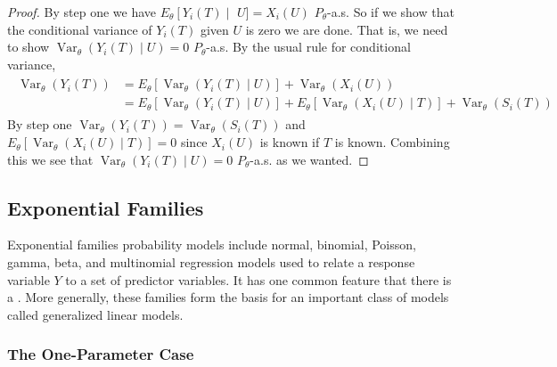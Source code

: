 \documentclass{article}
\begin{document}
\begin{proof}
By step one we have $E_{\theta}\left[Y_{i}(T) \mid\right.$ $U]=X_{i}(U)$ $P_{\theta}$-a.s. So if we show that the conditional variance of $Y_{i}(T)$ given $U$ is zero we are done. That is, we need to show $\operatorname{Var}_{\theta}\left(Y_{i}(T) \mid U\right)=0$ $P_{\theta}$-a.s. By the usual rule for conditional variance,
\begin{align*}
\begin{aligned}
\operatorname{Var}_{\theta}\left(Y_{i}(T)\right) &=E_{\theta}\left[\operatorname{Var}_{\theta}\left(Y_{i}(T) \mid U\right)\right]+\operatorname{Var}_{\theta}\left(X_{i}(U)\right) \\
&=E_{\theta}\left[\operatorname{Var}_{\theta}\left(Y_{i}(T) \mid U\right)\right]+E_{\theta}\left[\operatorname{Var}_{\theta}\left(X_{i}(U) \mid T\right)\right]+\operatorname{Var}_{\theta}\left(S_{i}(T)\right)
\end{aligned}
\end{align*}
By step one $\operatorname{Var}_{\theta}\left(Y_{i}(T)\right)=\operatorname{Var}_{\theta}\left(S_{i}(T)\right)$ and $E_{\theta}\left[\operatorname{Var}_{\theta}\left(X_{i}(U) \mid T\right)\right]=0$ since $X_{i}(U)$ is known if $T$ is known. Combining this we see that $\operatorname{Var}_{\theta}\left(Y_{i}(T) \mid U\right)=0$ $P_{\theta}$-a.s. as we wanted.
\end{proof}

\subsection{Exponential Families}
Exponential families probability models include normal, binomial, Poisson, gamma, beta, and multinomial regression models used to relate a response variable $Y$ to a set of predictor variables. It has one  common feature that there is a . More generally, these families form the basis for an important class of models called generalized linear models. 
\subsubsection{The One-Parameter Case}
\end{document}
